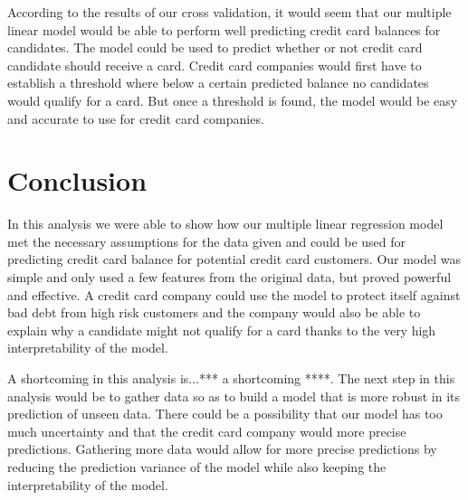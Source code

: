 \documentclass{article}
\begin{document}
According to the results of our cross validation, it would seem that our multiple linear model would be able to perform well predicting credit card balances for candidates. The model could be used to predict whether or not credit card candidate should receive a card. Credit card companies would first have to establish a threshold where below a certain predicted balance no candidates would qualify for a card. But once a threshold is found, the model would be easy and accurate to use for credit card companies.

\section{Conclusion}
In this analysis we were able to show how our multiple linear regression model met the necessary assumptions for the data given and could be used for predicting credit card balance for potential credit card customers. Our model was simple and only used a few features from the original data, but proved powerful and effective. A credit card company could use the model to protect itself against bad debt from high risk customers and the company would also be able to explain why a candidate might not qualify for a card thanks to the very high interpretability of the model.

A shortcoming in this analysis is...*** a shortcoming ****. The next step in this analysis would be to gather data so as to build a model that is more robust in its prediction of unseen data. There could be a possibility that our model has too much uncertainty and that the credit card company would more precise predictions. Gathering more data would allow for more precise predictions by reducing the prediction variance of the model while also keeping the interpretability of the model. 
\end{document}
